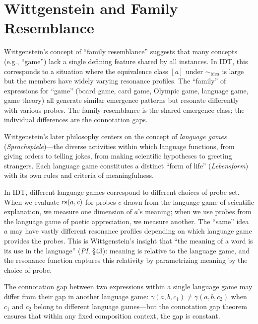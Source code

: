 \section{Wittgenstein and Family Resemblance}

\begin{example}
Wittgenstein's concept of ``family resemblance'' suggests that many
concepts (e.g., ``game'') lack a single defining feature shared by all
instances. In IDT, this corresponds to a situation where the equivalence
class $[a]$ under $\sim_{\mathrm{idea}}$ is large but the members have
widely varying resonance profiles. The ``family'' of expressions for
``game'' (board game, card game, Olympic game, language game, game
theory) all generate similar emergence patterns but resonate differently
with various probes. The family resemblance is the shared emergence
class; the individual differences are the connotation gaps.
\end{example}

\begin{remark}\label{rem:ch6:wittgenstein_language_games}
Wittgenstein's later philosophy centers on the concept of \emph{language
games} (\emph{Sprachspiele})---the diverse activities within which
language functions, from giving orders to telling jokes, from making
scientific hypotheses to greeting strangers. Each language game constitutes
a distinct ``form of life'' (\emph{Lebensform}) with its own rules and
criteria of meaningfulness.

In IDT, different language games correspond to different choices of probe
set. When we evaluate $\mathrm{rs}(a, c)$ for probes $c$ drawn from the language
game of scientific explanation, we measure one dimension of $a$'s meaning;
when we use probes from the language game of poetic appreciation, we
measure another. The ``same'' idea $a$ may have vastly different resonance
profiles depending on which language game provides the probes. This is
Wittgenstein's insight that ``the meaning of a word is its use in the
language'' (\emph{PI}, \S{}43): meaning is relative to the language
game, and the resonance function captures this relativity by
parametrizing meaning by the choice of probe.

The connotation gap between two expressions within a single language game
may differ from their gap in another language game: $\gamma(a, b, c_1)
\neq \gamma(a, b, c_2)$ when $c_1$ and $c_2$ belong to different language
games---but the connotation gap theorem ensures that within any fixed
composition context, the gap is constant.
\end{remark}

